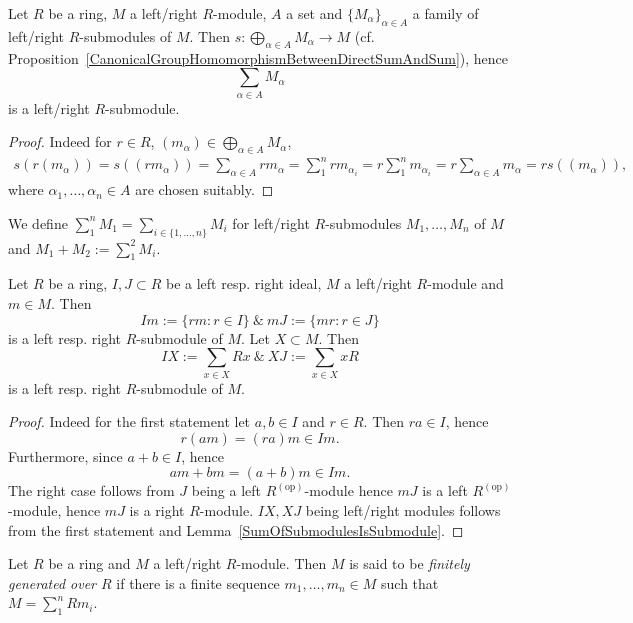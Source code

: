 \begin{lemma}\label{SumOfSubmodulesIsSubmodule}
    Let $R$ be a ring, $M$ a left/right $R$-module, $A$ a set and $\{M_\alpha\}_{\alpha\in A}$ a family of left/right $R$-submodules of $M$. Then $s : \bigoplus_{\alpha\in A} M_\alpha \rightarrow M$ (cf. Proposition~\ref{CanonicalGroupHomomorphismBetweenDirectSumAndSum}), hence
    $$\sum_{\alpha\in A} M_\alpha$$
    is a left/right $R$-submodule.
\end{lemma}
\begin{proof}
    Indeed for $r\in R$, $(m_\alpha)\in \bigoplus_{\alpha\in A} M_\alpha$,
    \begin{align*}
        s(r(m_\alpha))=s((rm_\alpha))= \sum_{\alpha\in A} rm_\alpha = \sum_1^n rm_{\alpha_i}= r\sum_1^n m_{\alpha_i} = r\sum_{\alpha\in A} m_\alpha = rs((m_\alpha)),
    \end{align*}
    where $\alpha_1,\dots,\alpha_n\in A$ are chosen suitably.
\end{proof}
\begin{remark}
    We define $\sum_1^n M_1 = \sum_{i \in \{1,\dots,n\}} M_i$ for left/right $R$-submodules $M_1,\dots, M_n$ of $M$ and $M_1+M_2 := \sum_1^2 M_i$. 
\end{remark}
\begin{lemma}
    Let $R$ be a ring, $I,J\subset R$ be a left resp. right ideal, $M$ a left/right $R$-module and $m\in M$. Then 
    $$Im := \{rm : r\in I\} \ \& \ mJ := \{mr : r \in J\}$$
    is a left resp. right $R$-submodule of $M$. Let $X\subset M$. Then 
    $$IX := \sum_{x\in X} Rx \ \& \ XJ := \sum_{x\in X} xR$$
    is a left resp. right $R$-submodule of $M$.
\end{lemma}
\begin{proof}
    Indeed for the first statement let $a,b\in I$ and $r\in R$. Then $ra\in I$, hence 
    $$r(am)=(ra)m\in Im.$$
    Furthermore, since $a+b\in I$, hence
    $$am+bm=(a+b)m\in Im.$$
    The right case follows from $J$ being a left $R^{(\mathrm{op})}$-module hence $mJ$ is a left $R^{(\mathrm{op})}$-module, hence $mJ$ is a right $R$-module.
    $IX, XJ$ being left/right modules follows from the first statement and Lemma~\ref{SumOfSubmodulesIsSubmodule}.
\end{proof}
\begin{definition}
    Let $R$ be a ring and $M$ a left/right $R$-module. Then $M$ is said to be \textit{finitely generated over $R$} if there is a finite sequence $m_1,\dots,m_n\in M$ such that $M= \sum_1^n Rm_i$.
\end{definition}

